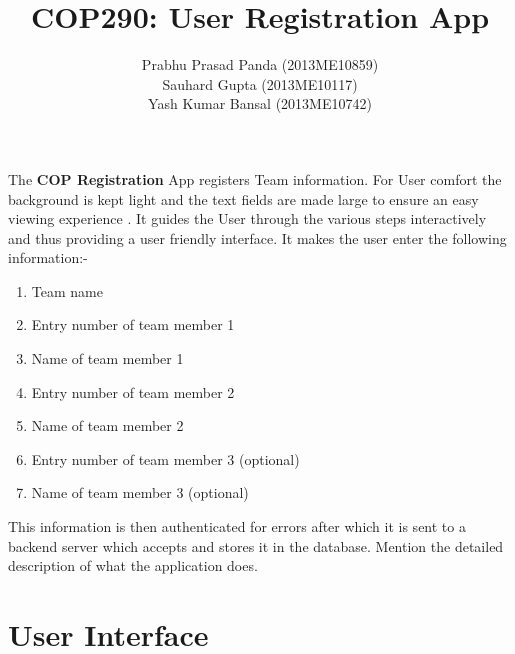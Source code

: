 \documentclass[12pt]{article}
\title{COP290: User Registration App}
\author{Prabhu Prasad Panda (2013ME10859) \\ 
Sauhard Gupta (2013ME10117) \\ 
Yash Kumar Bansal (2013ME10742) }
\begin{document}
\maketitle
   The \textbf{COP Registration} App registers Team information. For User comfort the background is kept light and the text fields are made large to ensure an easy viewing experience . It guides the User through the various steps interactively and thus providing a user friendly interface. It makes the user enter the following information:-
   \begin{enumerate}
\item Team name
\item Entry number of team member 1
\item Name of team member 1
\item Entry number of team member 2
\item Name of team member 2
\item Entry number of team member 3 (optional)
\item Name of team member 3 (optional)
\end{enumerate}
This information is then authenticated for errors after which it is sent to a backend server which accepts and stores it in the database.
Mention the detailed description of what the application does.

\section{User Interface}
\end{document}
